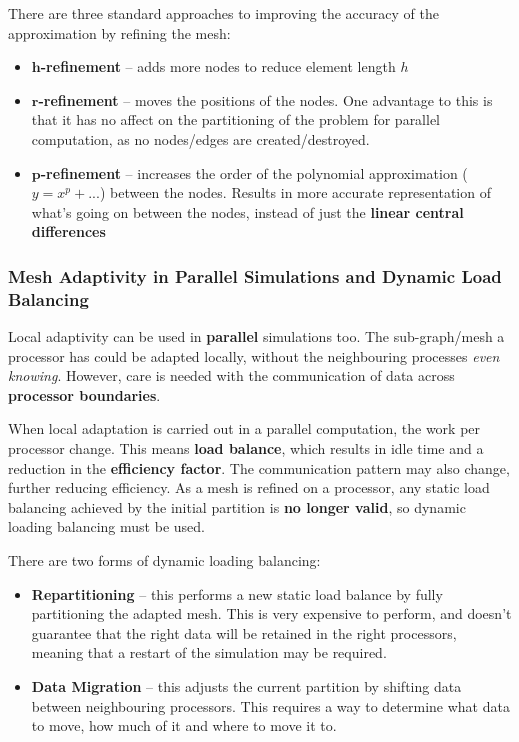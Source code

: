 \documentclass{article}
\begin{document}
There are three standard approaches to improving the accuracy of the approximation by refining the mesh:
\begin{itemize}
	\item \textbf{$\mathbf{h}$-refinement} -- adds more nodes to reduce element length $h$
	\item \textbf{$\mathbf{r}$-refinement} -- moves the positions of the nodes. One advantage to this is that it has no affect on the partitioning of the problem for parallel computation, as no nodes/edges are created/destroyed.
	\item \textbf{$\mathbf{p}$-refinement} -- increases the order of the polynomial approximation ($y = x^p + ...$) between the nodes. Results in more accurate representation of what's going on between the nodes, instead of just the \textbf{linear central differences}
\end{itemize}

\subsubsection{Mesh Adaptivity in Parallel Simulations and Dynamic Load Balancing}

Local adaptivity can be used in \textbf{parallel} simulations too. The sub-graph/mesh a processor has could be adapted locally, without the neighbouring processes \textit{even knowing}. However, care is needed with the communication of data across \textbf{processor boundaries}.

When local adaptation is carried out in a parallel computation, the work per processor change. This means \textbf{load balance}, which results in idle time and a reduction in the \textbf{efficiency factor}. The communication pattern may also change, further reducing efficiency. As a mesh is refined on a processor, any static load balancing achieved by the initial partition is \textbf{no longer valid}, so dynamic loading balancing must be used.

There are two forms of dynamic loading balancing:
\begin{itemize}
	\item \textbf{Repartitioning} -- this performs a new static load balance by fully partitioning the adapted mesh. This is very expensive to perform, and doesn't guarantee that the right data will be retained in the right processors, meaning that a restart of the simulation may be required.
	\item \textbf{Data Migration} -- this adjusts the current partition by shifting data between neighbouring processors. This requires a way to determine what data to move, how much of it and where to move it to.
\end{itemize}
\end{document}
